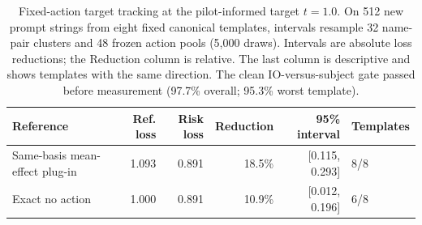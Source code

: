\begin{table}[H]
\centering
\scriptsize
\begin{tabular}{@{}lrrrrl@{}}
\toprule
Reference & Ref. loss & Risk loss & Reduction & 95\% interval & Templates \\
\midrule
Same-basis mean-effect plug-in & 1.093 & 0.891 & 18.5\% & [0.115, 0.293] & 8/8 \\
Exact no action & 1.000 & 0.891 & 10.9\% & [0.012, 0.196] & 6/8 \\
\bottomrule
\end{tabular}
\caption{Fixed-action target tracking at the pilot-informed target $t=1.0$. On 512 new prompt strings from eight fixed canonical templates, intervals resample 32 name-pair clusters and 48 frozen action pools (5,000 draws). Intervals are absolute loss reductions; the Reduction column is relative. The last column is descriptive and shows templates with the same direction. The clean IO-versus-subject gate passed before measurement (97.7\% overall; 95.3\% worst template).}
\label{tab:phase7-ioi-confirmation}
\end{table}
